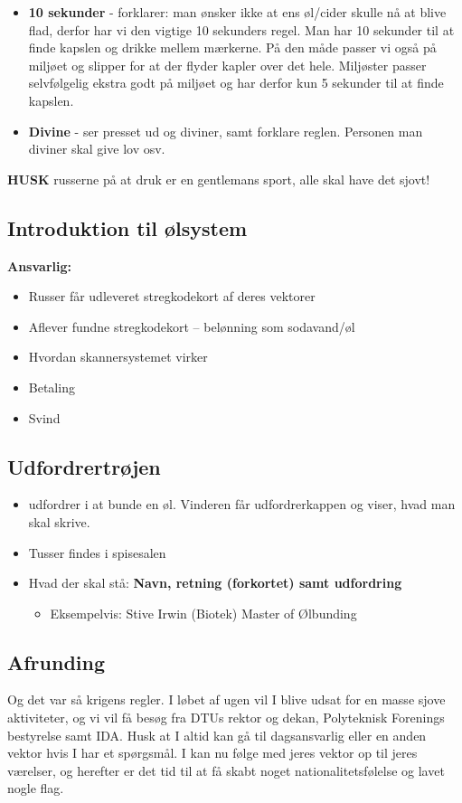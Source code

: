\begin{itemize}
  \item \textbf{10 sekunder} - \buddha forklarer: man ønsker ikke at ens øl/cider skulle nå at blive flad, derfor har vi den vigtige 10 sekunders regel. Man har 10 sekunder til at finde kapslen og drikke mellem mærkerne. På den måde passer vi også på miljøet og slipper for at der flyder kapler over det hele. Miljøster passer selvfølgelig ekstra godt på miljøet og har derfor kun 5 sekunder til at finde kapslen.
  \item \textbf{Divine} - \buddha ser presset ud og \randildo diviner, samt forklare reglen. Personen man diviner skal give lov osv.
\end{itemize}

\textbf{HUSK} russerne på at druk er en gentlemans sport, alle skal have det sjovt!

\subsection*{Introduktion til ølsystem}
\textbf{Ansvarlig:} \Mighty
\begin{itemize}
  \item Russer får udleveret stregkodekort af deres vektorer
  \item Aflever fundne stregkodekort – belønning som sodavand/øl
  \item Hvordan skannersystemet virker
  \item Betaling
  \item Svind
\end{itemize}

\subsection*{Udfordrertrøjen} 
\begin{itemize}
  \item \mighty udfordrer \stive i at bunde en øl. Vinderen får udfordrerkappen og viser, hvad man skal skrive.
  \item Tusser findes i spisesalen
  \item Hvad der skal stå: \textbf{Navn, retning (forkortet) samt udfordring}
  \begin{itemize}
    \item Eksempelvis: Stive Irwin (Biotek) Master of Ølbunding
  \end{itemize}
\end{itemize}

\subsection*{Afrunding}
Og det var så krigens regler. I løbet af ugen vil I blive udsat for en masse sjove aktiviteter, og vi vil få besøg fra DTUs rektor og dekan, Polyteknisk Forenings bestyrelse samt IDA. Husk at I altid kan gå til dagsansvarlig eller en anden vektor hvis I har et spørgsmål. I kan nu følge med jeres vektor op til jeres værelser, og herefter er det tid til at få skabt noget nationalitetsfølelse og lavet nogle flag.


